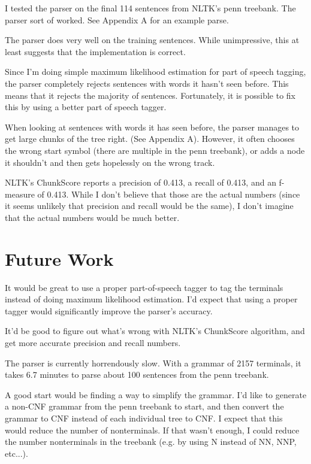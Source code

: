 \documentclass{article}
\begin{document}
I tested the parser on the final 114 sentences from NLTK's penn treebank. The parser sort of worked. See Appendix A for an example parse.

The parser does very well on the training sentences. While unimpressive, this at least suggests that the implementation is correct.

Since I'm doing simple maximum likelihood estimation for part of speech tagging, the parser completely rejects sentences with words it hasn't seen before. This means that it rejects the majority of sentences. Fortunately, it is possible to fix this by using a better part of speech tagger.

When looking at sentences with words it has seen before, the parser manages to get large chunks of the tree right. (See Appendix A). However, it often chooses the wrong start symbol (there are multiple in the penn treebank), or adds a node it shouldn't and then gets hopelessly on the wrong track.

NLTK's ChunkScore reports a precision of 0.413, a recall of 0.413, and an f-measure of 0.413. While I don't believe that those are the actual numbers (since it seems unlikely that precision and recall would be the same), I don't imagine that the actual numbers would be much better.

\section{Future Work}

It would be great to use a proper part-of-speech tagger to tag the terminals instead of doing maximum likelihood estimation. I'd expect that using a proper tagger would significantly improve the parser's accuracy.

It'd be good to figure out what's wrong with NLTK's ChunkScore algorithm, and get more accurate precision and recall numbers.

The parser is currently horrendously slow. With a grammar of 2157 terminals, it takes 6.7 minutes to parse about 100 sentences from the penn treebank. 

A good start would be finding a way to simplify the grammar. I'd like to generate a non-CNF grammar from the penn treebank to start, and then convert the grammar to CNF instead of each individual tree to CNF. I expect that this would reduce the number of nonterminals. If that wasn't enough, I could reduce the number nonterminals in the treebank (e.g. by using N instead of NN, NNP, etc...).
\end{document}
